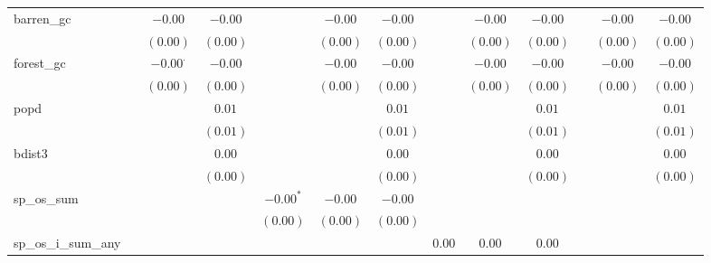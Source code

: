 \begin{sidewaystable}
\begin{center}
{\begin{tabular}{l c c c c c c c c c c c c}
barren\_gc          &               & $-0.00$         & $-0.00$         &               & $-0.00$         & $-0.00$      &               & $-0.00$      & $-0.00$      &               & $-0.00$      & $-0.00$      \\
                    &               & $(0.00)$        & $(0.00)$        &               & $(0.00)$        & $(0.00)$     &               & $(0.00)$     & $(0.00)$     &               & $(0.00)$     & $(0.00)$     \\
forest\_gc          &               & $-0.00^{\cdot}$ & $-0.00$         &               & $-0.00$         & $-0.00$      &               & $-0.00$      & $-0.00$      &               & $-0.00$      & $-0.00$      \\
                    &               & $(0.00)$        & $(0.00)$        &               & $(0.00)$        & $(0.00)$     &               & $(0.00)$     & $(0.00)$     &               & $(0.00)$     & $(0.00)$     \\
popd                &               &                 & $0.01$          &               &                 & $0.01$       &               &              & $0.01$       &               &              & $0.01$       \\
                    &               &                 & $(0.01)$        &               &                 & $(0.01)$     &               &              & $(0.01)$     &               &              & $(0.01)$     \\
bdist3              &               &                 & $0.00$          &               &                 & $0.00$       &               &              & $0.00$       &               &              & $0.00$       \\
                    &               &                 & $(0.00)$        &               &                 & $(0.00)$     &               &              & $(0.00)$     &               &              & $(0.00)$     \\
sp\_os\_sum         &               &                 &                 & $-0.00^{*}$   & $-0.00$         & $-0.00$      &               &              &              &               &              &              \\
                    &               &                 &                 & $(0.00)$      & $(0.00)$        & $(0.00)$     &               &              &              &               &              &              \\
sp\_os\_i\_sum\_any &               &                 &                 &               &                 &              & $0.00$        & $0.00$       & $0.00$       &               &              &              \\

\end{tabular}}
\end{center}
\end{sidewaystable}
